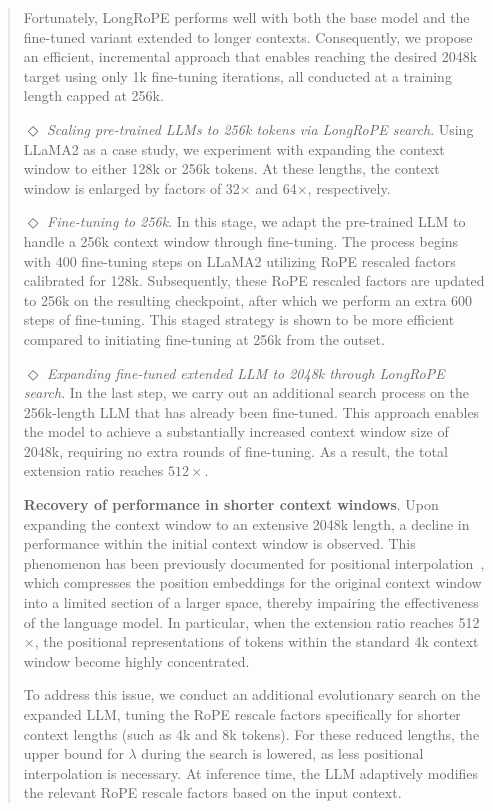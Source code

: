 \begin{abstract}
Fortunately, LongRoPE performs well with both the base model and the fine-tuned variant extended to longer contexts. Consequently, we propose an efficient, incremental approach that enables reaching the desired 2048k target using only 1k fine-tuning iterations, all conducted at a training length capped at 256k.

$\Diamond$ \textit{Scaling pre-trained LLMs to 256k tokens via LongRoPE search}. Using LLaMA2 as a case study, we experiment with expanding the context window to either 128k or 256k tokens. At these lengths, the context window is enlarged by factors of 32$\times$ and 64$\times$, respectively.

$\Diamond$ \textit{Fine-tuning to 256k}. In this stage, we adapt the pre-trained LLM to handle a 256k context window through fine-tuning. The process begins with 400 fine-tuning steps on LLaMA2 utilizing RoPE rescaled factors calibrated for 128k. Subsequently, these RoPE rescaled factors are updated to 256k on the resulting checkpoint, after which we perform an extra 600 steps of fine-tuning. This staged strategy is shown to be more efficient compared to initiating fine-tuning at 256k from the outset.

$\Diamond$ \textit{Expanding fine-tuned extended LLM to 2048k through LongRoPE search}. In the last step, we carry out an additional search process on the 256k-length LLM that has already been fine-tuned. This approach enables the model to achieve a substantially increased context window size of 2048k, requiring no extra rounds of fine-tuning. As a result, the total extension ratio reaches $512\times$.

\textbf{Recovery of performance in shorter context windows}. Upon expanding the context window to an extensive 2048k length, a decline in performance within the initial context window is observed. This phenomenon has been previously documented for positional interpolation~\cite{pi}, which compresses the position embeddings for the original context window into a limited section of a larger space, thereby impairing the effectiveness of the language model. In particular, when the extension ratio reaches 512$\times$, the positional representations of tokens within the standard 4k context window become highly concentrated.

To address this issue, we conduct an additional evolutionary search on the expanded LLM, tuning the RoPE rescale factors specifically for shorter context lengths (such as 4k and 8k tokens). For these reduced lengths, the upper bound for $\lambda$ during the search is lowered, as less positional interpolation is necessary. At inference time, the LLM adaptively modifies the relevant RoPE rescale factors based on the input context.


\end{abstract}
